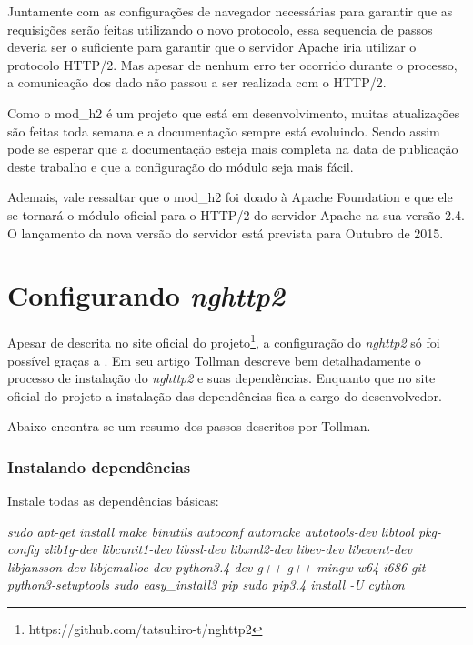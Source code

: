 \begin{apendicesenv}
Juntamente com as configurações de navegador necessárias para garantir que as requisições serão feitas utilizando o novo protocolo, essa sequencia de passos deveria ser o suficiente para garantir que o servidor Apache iria utilizar o protocolo HTTP/2. Mas apesar de nenhum erro ter ocorrido durante o processo, a comunicação dos dado não passou a ser realizada com o HTTP/2.

Como o mod\_h2 é um projeto que está em desenvolvimento, muitas atualizações são feitas toda semana e a documentação sempre está evoluindo. Sendo assim pode se esperar que a documentação esteja mais completa na data de publicação deste trabalho e que a configuração do módulo seja mais fácil.

Ademais, vale ressaltar que o mod\_h2 foi doado à Apache Foundation e que ele se tornará o módulo oficial para o HTTP/2 do servidor Apache na sua versão 2.4. O lançamento da nova versão do servidor está prevista para Outubro de 2015.

\chapter{Configurando \textit{nghttp2}}
\label{apend:configurandonghttp2}

Apesar de descrita no site oficial do projeto\footnote{https://github.com/tatsuhiro-t/nghttp2}, a configuração do \textit{nghttp2} só foi possível graças a . Em seu artigo Tollman descreve bem detalhadamente o processo de instalação do \textit{nghttp2} e suas dependências. Enquanto que no site oficial do projeto a instalação das dependências fica a cargo do desenvolvedor. 

Abaixo encontra-se um resumo dos passos descritos por Tollman.

\subsection{Instalando dependências}
Instale todas as dependências básicas:
	\begin{center}
		\textit{sudo apt-get install make binutils autoconf automake autotools-dev libtool pkg-config zlib1g-dev libcunit1-dev libssl-dev libxml2-dev libev-dev libevent-dev libjansson-dev libjemalloc-dev python3.4-dev g++ g++-mingw-w64-i686 git python3-setuptools}	
		\textit{sudo easy\_install3 pip}
		\textit{sudo pip3.4 install -U cython}
	\end{center}


\end{apendicesenv}

